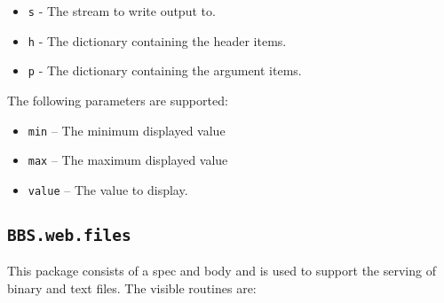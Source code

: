 \documentclass[10pt, openany]{book}
\newcommand{\package}[1]{\texttt{#1}}
\newcommand{\keyword}[1]{\texttt{#1}}
\begin{document}
\begin{itemize}
  \item \keyword{s} - The stream to write output to.
  \item \keyword{h} - The dictionary containing the header items.
  \item \keyword{p} - The dictionary containing the argument items.
\end{itemize}
  The following parameters are supported:
  \begin{itemize}
    \item \keyword{min} -- The minimum displayed value
    \item \keyword{max} -- The maximum displayed value
    \item \keyword{value} -- The value to display.
  \end{itemize}

\subsection{\package{BBS.web.files}}
This package consists of a spec and body and is used to support the serving of binary and text files.  The visible routines are:
\end{document}
